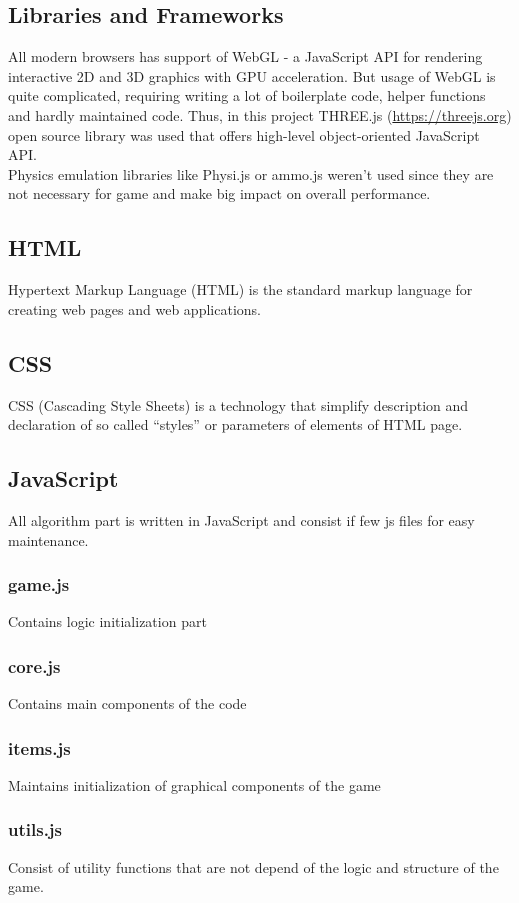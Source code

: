 \documentclass[12pt]{article}
\begin{document}
\subsection{Libraries and Frameworks}
All modern browsers has support of WebGL - a JavaScript API for rendering interactive 2D and 3D graphics with GPU acceleration\citep{wiki:webgl}. But usage of WebGL is quite complicated, requiring writing a lot of boilerplate code, helper functions and hardly maintained code. Thus, in this project THREE.js (\url{https://threejs.org}) open source library was used that offers high-level object-oriented JavaScript API.
\\
Physics emulation libraries like Physi.js or ammo.js weren't used since they are not necessary for game and make big impact on overall performance.
\subsection{HTML}
Hypertext Markup Language (HTML) is the standard markup language for creating web pages and web applications\citep{wiki:html}.
\subsection{CSS}
CSS (Cascading Style Sheets) is a technology that simplify description and declaration of so called ``styles'' or parameters of elements of HTML page\citep{wiki:css}. 
\subsection{JavaScript}
All algorithm part is written in JavaScript and consist if few js files for easy maintenance.
\subsubsection{game.js}
Contains logic initialization part
\subsubsection{core.js}
Contains main components of the code
\subsubsection{items.js}
Maintains initialization of graphical components of the game
\subsubsection{utils.js}
Consist of utility functions that are not depend of the logic and structure of the game.
\end{document}

